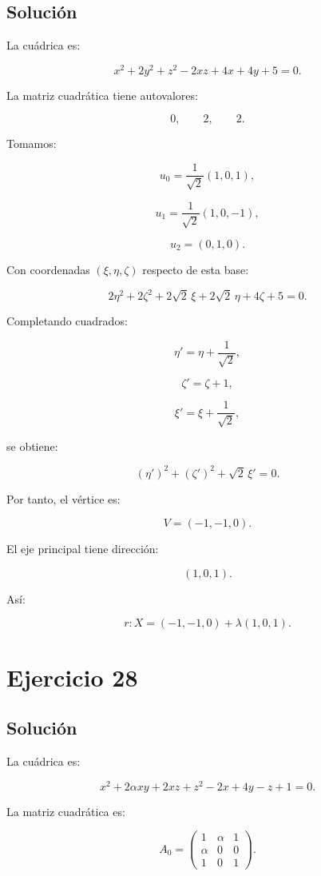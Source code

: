 \documentclass[11pt,a4paper]{article}
\begin{document}
\subsection{Solución}

La cuádrica es:

\[
x^2+2y^2+z^2-2xz+4x+4y+5=0.
\]

La matriz cuadrática tiene autovalores:

\[
0,
\qquad
2,
\qquad
2.
\]

Tomamos:

\[
u_0=
\frac1{\sqrt2}(1,0,1),
\]

\[
u_1=
\frac1{\sqrt2}(1,0,-1),
\]

\[
u_2=(0,1,0).
\]

Con coordenadas \((\xi,\eta,\zeta)\) respecto de esta base:

\[
2\eta^2+2\zeta^2
+
2\sqrt2\,\xi
+
2\sqrt2\,\eta
+
4\zeta
+
5
=
0.
\]

Completando cuadrados:

\[
\eta'=
\eta+\frac1{\sqrt2},
\]

\[
\zeta'=\zeta+1,
\]

\[
\xi'=
\xi+\frac1{\sqrt2},
\]

se obtiene:

\[
\boxed{
(\eta')^2+(\zeta')^2+\sqrt2\,\xi'=0.
}
\]

Por tanto, el vértice es:

\[
\boxed{
V=(-1,-1,0).
}
\]

El eje principal tiene dirección:

\[
(1,0,1).
\]

Así:

\[
\boxed{
r:
X=(-1,-1,0)+\lambda(1,0,1).
}
\]

\section{Ejercicio 28}
\subsection{Solución}

La cuádrica es:

\[
x^2+2\alpha xy+2xz+z^2-2x+4y-z+1=0.
\]

La matriz cuadrática es:

\[
A_0=
\begin{pmatrix}
1&\alpha&1\\
\alpha&0&0\\
1&0&1
\end{pmatrix}.
\]
\end{document}
